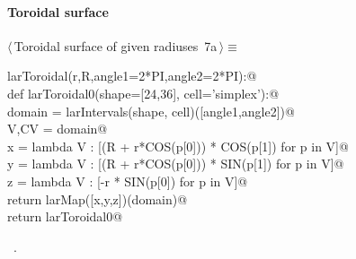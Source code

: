 \documentclass[11pt,oneside]{article}	%
\begin{document}
\paragraph{Toroidal surface}
\begin{flushleft} \small \label{scrap11}
\protect{}$\langle\,$Toroidal surface of given radiuses\nobreak\ {\footnotesize 7a}$\,\rangle\equiv$
\vspace{-1ex}
\begin{list}{}{} \item
\mbox{}\verb@def larToroidal(r,R,angle1=2*PI,angle2=2*PI):@\\
\mbox{}\verb@   def larToroidal0(shape=[24,36], cell='simplex'):@\\
\mbox{}\verb@      domain = larIntervals(shape, cell)([angle1,angle2])@\\
\mbox{}\verb@      V,CV = domain@\\
\mbox{}\verb@      x = lambda V : [(R + r*COS(p[0])) * COS(p[1]) for p in V]@\\
\mbox{}\verb@      y = lambda V : [(R + r*COS(p[0])) * SIN(p[1]) for p in V]@\\
\mbox{}\verb@      z = lambda V : [-r * SIN(p[0]) for p in V]@\\
\mbox{}\verb@      return larMap([x,y,z])(domain)@\\
\mbox{}\verb@   return larToroidal0@\\
\mbox{}\verb@@{\NWsep}
\end{list}
\vspace{-1ex}
\footnotesize\addtolength{\baselineskip}{-1ex}
\begin{list}{}{\setlength{\itemsep}{-\parsep}\setlength{\itemindent}{-\leftmargin}}
\item \NWtxtMacroRefIn\ .
\end{list}
\end{flushleft}
\end{document}
